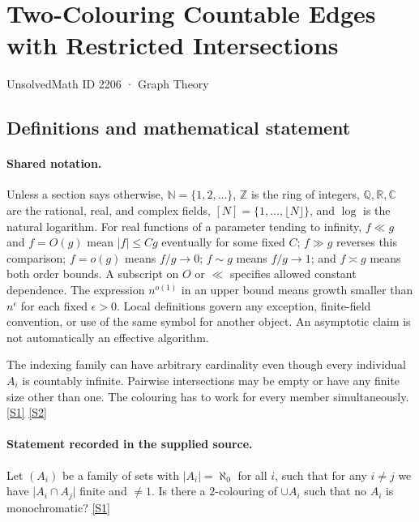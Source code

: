\documentclass[11pt,a4paper]{article}
\newcommand{\N}{\mathbb{N}}
\newcommand{\Z}{\mathbb{Z}}
\newcommand{\Q}{\mathbb{Q}}
\newcommand{\R}{\mathbb{R}}
\newcommand{\C}{\mathbb{C}}
\newcommand{\sref}[2]{\hyperlink{source:#1:#2}{[S#2]}}
\begin{document}

\setcounter{section}{2205}

\section{Two-Colouring Countable Edges with Restricted Intersections}\label{2206}

{\small\sffamily UnsolvedMath ID 2206 · Graph Theory}

\subsection{Definitions and mathematical statement}

\paragraph{Shared notation.}Unless a section says otherwise, $\N=\{1,2,\ldots\}$,
$\Z$ is the ring of integers, $\Q,\R,\C$ are the rational, real, and complex
fields, $[N]=\{1,\ldots,\lfloor N\rfloor\}$, and $\log$ is the natural
logarithm. For real functions of a parameter tending to infinity,
$f\ll g$ and $f=O(g)$ mean $|f|\leq Cg$ eventually for some fixed $C$;
$f\gg g$ reverses this comparison; $f=o(g)$ means $f/g\to0$;
$f\sim g$ means $f/g\to1$; and $f\asymp g$ means both order bounds.
A subscript on $O$ or $\ll$ specifies allowed constant dependence.
The expression $n^{o(1)}$ in an upper bound means growth smaller than
$n^\epsilon$ for each fixed $\epsilon>0$. Local definitions govern any
exception, finite-field convention, or use of the same symbol for another
object. An asymptotic claim is not automatically an effective algorithm.



The indexing family can have arbitrary cardinality even though every individual $A_i$ is countably infinite. Pairwise intersections may be empty or have any finite size other than one. The colouring has to work for every member simultaneously. \sref{2206}{1} \sref{2206}{2}

\paragraph{Statement recorded in the supplied source.}
Let $(A_i)$ be a family of sets with $\lvert A_i\rvert=\aleph_0$ for all $i$, such that for any $i\neq j$ we have $\lvert A_i\cap A_j\rvert$ finite and $\neq 1$. Is there a $2$-colouring of $\cup A_i$ such that no $A_i$ is monochromatic? \sref{2206}{1}
\end{document}

